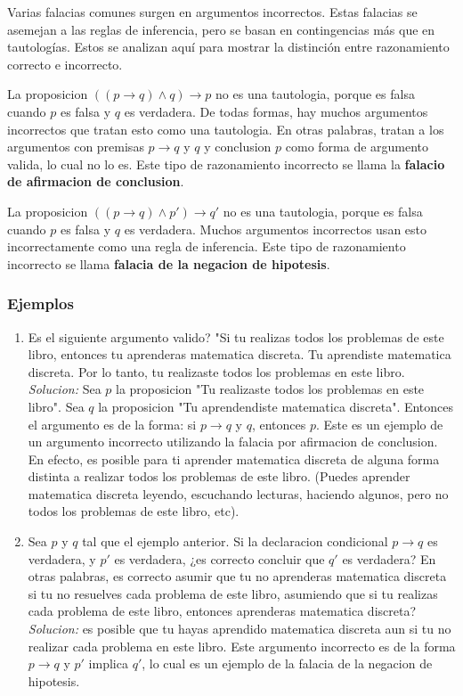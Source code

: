 \documentclass[]{article}
\begin{document}
Varias falacias comunes surgen en argumentos incorrectos. Estas falacias se asemejan a las reglas de inferencia, pero se basan en contingencias más que en tautologías. Estos se analizan aquí para mostrar la distinción entre razonamiento correcto e incorrecto.

La proposicion $((p \rightarrow q) \wedge q) \rightarrow p$ no es una tautologia, porque es falsa cuando $p$ es falsa y $q$ es verdadera. De todas formas, hay muchos argumentos incorrectos que tratan esto como una tautologia. En otras palabras, tratan a los argumentos con premisas $p \rightarrow q$ y $q$ y conclusion $p$ como forma de argumento valida, lo cual no lo es. Este tipo de razonamiento incorrecto se llama la \textbf{falacio de afirmacion de conclusion}.

La proposicion $((p \rightarrow q) \wedge p') \rightarrow q'$ no es una tautologia, porque es falsa cuando $p$ es falsa y $q$ es verdadera. Muchos argumentos incorrectos usan esto incorrectamente como una regla de inferencia. Este tipo de razonamiento incorrecto se llama \textbf{falacia de la negacion de hipotesis}.

\subsubsection*{Ejemplos}

\begin{enumerate}
	\item Es el siguiente argumento valido? "Si tu realizas todos los problemas de este libro, entonces tu aprenderas matematica discreta. Tu aprendiste matematica discreta. Por lo tanto, tu realizaste todos los problemas en este libro.\\
	\textit{Solucion:} Sea $p$ la proposicion "Tu realizaste todos los problemas en este libro". Sea $q$ la proposicion "Tu aprendendiste matematica discreta". Entonces el argumento es de la forma: si $p \rightarrow q$ y $q$, entonces $p$. Este es un ejemplo de un argumento incorrecto utilizando la falacia por afirmacion de conclusion. En efecto, es posible para ti aprender matematica discreta de alguna forma distinta a realizar todos los problemas de este libro. (Puedes aprender matematica discreta leyendo, escuchando lecturas, haciendo algunos, pero no todos los problemas de este libro, etc).

	\item Sea $p$ y $q$ tal que el ejemplo anterior. Si la declaracion condicional $p \rightarrow q$ es verdadera, y $p'$ es verdadera, ¿es correcto concluir que $q'$ es verdadera? En otras palabras, es correcto asumir que tu no aprenderas matematica discreta si tu no resuelves cada problema de este libro, asumiendo que si tu realizas cada problema de este libro, entonces aprenderas matematica discreta?\\
	\textit{Solucion:} es posible que tu hayas aprendido matematica discreta aun si tu no realizar cada problema en este libro. Este argumento incorrecto es de la forma $p \rightarrow q$ y $p'$ implica $q'$, lo cual es un ejemplo de la falacia de la negacion de hipotesis.
\end{enumerate}
\end{document}
